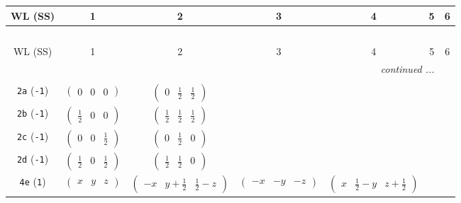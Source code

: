 \documentclass[fleqn,9pt,landscape]{jsarticle}
\begin{document}
\begin{center}
\renewcommand{\arraystretch}{1.2}
\begin{longtable}{ccccccc}
 \hline \hline
WL (SS) & 1 & 2 & 3 & 4 & 5 & 6 \\ \hline \endfirsthead

\multicolumn{6}{l}{\tablename\ \thetable{}} \\
 \hline \hline
WL (SS) & 1 & 2 & 3 & 4 & 5 & 6 \\ \hline \endhead

 \hline \hline
\multicolumn{6}{r}{\footnotesize\it continued ...} \\ \endfoot

 \hline \hline
\multicolumn{6}{r}{} \\ \endlastfoot

{\tt 2a} ({\tt -1}) & $ \begin{pmatrix} 0 & 0 & 0 \end{pmatrix} $ & $ \begin{pmatrix} 0 & \frac{1}{2} & \frac{1}{2} \end{pmatrix} $ & $  $ & $  $ \\ \hline
{\tt 2b} ({\tt -1}) & $ \begin{pmatrix} \frac{1}{2} & 0 & 0 \end{pmatrix} $ & $ \begin{pmatrix} \frac{1}{2} & \frac{1}{2} & \frac{1}{2} \end{pmatrix} $ & $  $ & $  $ \\ \hline
{\tt 2c} ({\tt -1}) & $ \begin{pmatrix} 0 & 0 & \frac{1}{2} \end{pmatrix} $ & $ \begin{pmatrix} 0 & \frac{1}{2} & 0 \end{pmatrix} $ & $  $ & $  $ \\ \hline
{\tt 2d} ({\tt -1}) & $ \begin{pmatrix} \frac{1}{2} & 0 & \frac{1}{2} \end{pmatrix} $ & $ \begin{pmatrix} \frac{1}{2} & \frac{1}{2} & 0 \end{pmatrix} $ & $  $ & $  $ \\ \hline
{\tt 4e} ({\tt 1}) & $ \begin{pmatrix} x & y & z \end{pmatrix} $ & $ \begin{pmatrix} - x & y + \frac{1}{2} & \frac{1}{2} - z \end{pmatrix} $ & $ \begin{pmatrix} - x & - y & - z \end{pmatrix} $ & $ \begin{pmatrix} x & \frac{1}{2} - y & z + \frac{1}{2} \end{pmatrix} $ \\
\end{longtable}
\end{center}
\end{document}
